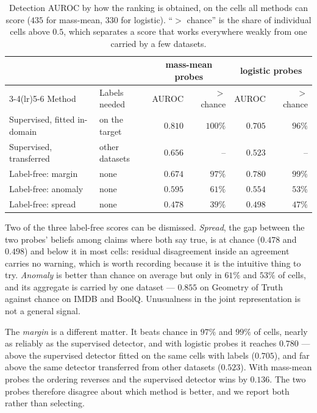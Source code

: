 \begin{table}[h]
\centering
\small
\begin{tabular}{llrrrr}
\toprule
& & \multicolumn{2}{c}{mass-mean probes} & \multicolumn{2}{c}{logistic probes} \\
\cmidrule(lr){3-4}\cmidrule(lr){5-6}
Method & Labels needed & AUROC & $>$ chance & AUROC & $>$ chance \\
\midrule
Supervised, fitted in-domain   & on the target     & $0.810$ & $100\%$ & $0.705$ & $96\%$ \\
Supervised, transferred        & other datasets    & $0.656$ & --      & $0.523$ & --     \\
\addlinespace
Label-free: margin             & none              & $0.674$ & $97\%$  & $\mathbf{0.780}$ & $99\%$ \\
Label-free: anomaly            & none              & $0.595$ & $61\%$  & $0.554$ & $53\%$ \\
Label-free: spread             & none              & $0.478$ & $39\%$  & $0.498$ & $47\%$ \\
\bottomrule
\end{tabular}
\caption{Detection AUROC by how the ranking is obtained, on the cells all
methods can score ($435$ for mass-mean, $330$ for logistic). ``$>$ chance'' is
the share of individual cells above $0.5$, which separates a score that works
everywhere weakly from one carried by a few datasets.}
\label{tab:unsup}
\end{table}

Two of the three label-free scores can be dismissed. \emph{Spread}, the gap
between the two probes' beliefs among claims where both say true, is at chance
($0.478$ and $0.498$) and below it in most cells: residual disagreement inside
an agreement carries no warning, which is worth recording because it is the
intuitive thing to try. \emph{Anomaly} is better than chance on average but
only in $61\%$ and $53\%$ of cells, and its aggregate is carried by one dataset
--- $0.855$ on Geometry of Truth against chance on IMDB and BoolQ. Unusualness
in the joint representation is not a general signal.

The \emph{margin} is a different matter. It beats chance in $97\%$ and $99\%$ of
cells, nearly as reliably as the supervised detector, and with logistic probes
it reaches $0.780$ --- above the supervised detector fitted on the same cells
with labels ($0.705$), and far above the same detector transferred from other
datasets ($0.523$). With mass-mean probes the ordering reverses and the
supervised detector wins by $0.136$. The two probes therefore disagree about
which method is better, and we report both rather than selecting.

